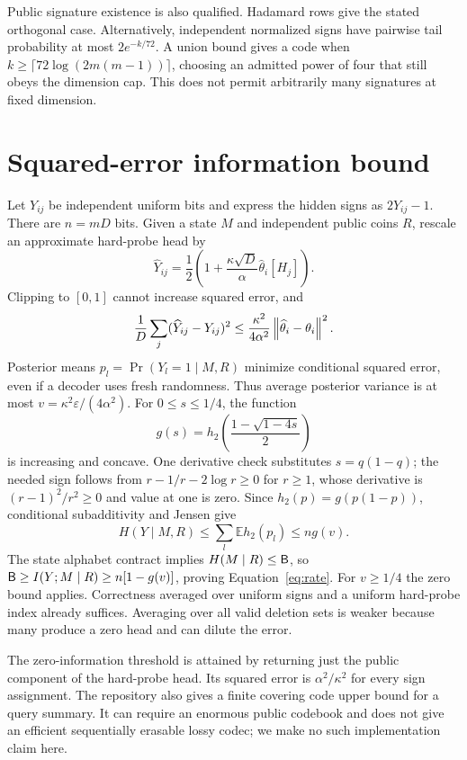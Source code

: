 Public signature existence is also qualified. Hadamard rows give the
stated orthogonal case. Alternatively, independent normalized signs have
pairwise tail probability at most $2e^{-k/72}$. A union bound gives a
code when $k\ge\lceil72\log(2m(m-1))\rceil$, choosing an admitted
power of four that still obeys the dimension cap. This does not permit
arbitrarily many signatures at fixed dimension.

\section{Squared-error information bound}\label{app:information}
Let $Y_{ij}$ be independent uniform bits and express the hidden signs as
$2Y_{ij}-1$. There are $n=mD$ bits. Given a state $M$ and independent
public coins $R$, rescale an approximate hard-probe head by
\[
 \widehat Y_{ij}=\frac12\left(1+
                       \frac{\kappa\sqrt D}{\alpha}\widehat\theta_i[H_j]\right).
\]
Clipping to $[0,1]$ cannot increase squared error, and
\[
 \frac1D\sum_j(\widehat Y_{ij}-Y_{ij})^2
 \le\frac{\kappa^2}{4\alpha^2}\left\lVert\widehat\theta_i-\theta_i\right\rVert^2.
\]
Posterior means $p_l=\Pr(Y_l=1\mid M,R)$ minimize conditional squared
error, even if a decoder uses fresh randomness. Thus average posterior
variance is at most $v=\kappa^2\varepsilon/(4\alpha^2)$. For
$0\le s\le1/4$, the function
\[
 g(s)=h_2\!\left(\frac{1-\sqrt{1-4s}}2\right)
\]
is increasing and concave. One derivative check substitutes $s=q(1-q)$;
the needed sign follows from
$r-1/r-2\log r\ge0$ for $r\ge1$, whose derivative is
$(r-1)^2/r^2\ge0$ and value at one is zero. Since
$h_2(p)=g(p(1-p))$, conditional subadditivity and Jensen give
\[
 H(Y\mid M,R)\le\sum_l\mathbb E h_2(p_l)\le n g(v).
\]
The state alphabet contract implies $H(M\mid R)\le\mathsf B$, so
$\mathsf B\ge I(Y;M\mid R)\ge n[1-g(v)]$, proving
Equation~\eqref{eq:rate}. For $v\ge1/4$ the zero bound applies. Correctness
averaged over uniform signs and a uniform hard-probe index already
suffices. Averaging over all valid deletion sets is weaker because many
produce a zero head and can dilute the error.

The zero-information threshold is attained by returning just the public
component of the hard-probe head. Its squared error is $\alpha^2/\kappa^2$
for every sign assignment. The repository also gives a finite covering
code upper bound for a query summary. It can require an enormous public
codebook and does not give an efficient sequentially erasable lossy codec;
we make no such implementation claim here.

